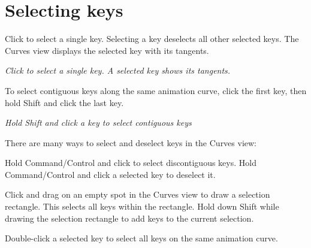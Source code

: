 \chapter{Selecting keys}
\hypertarget{md__hey_tea_9_2_library_2_package_cache_2com_8unity_8timeline_0d1_87_85_2_documentation_0i_2crv__keys__sel}{}\label{md__hey_tea_9_2_library_2_package_cache_2com_8unity_8timeline_0d1_87_85_2_documentation_0i_2crv__keys__sel}
\label{md__hey_tea_9_2_library_2_package_cache_2com_8unity_8timeline_0d1_87_85_2_documentation_0i_2crv__keys__sel_autotoc_md4640}%
%
 Click to select a single key. Selecting a key deselects all other selected keys. The Curves view displays the selected key with its tangents.



{\itshape Click to select a single key. A selected key shows its tangents.}

To select contiguous keys along the same animation curve, click the first key, then hold Shift and click the last key.



{\itshape Hold Shift and click a key to select contiguous keys}

There are many ways to select and deselect keys in the Curves view\+:


\begin{DoxyItemize}
\item Hold Command/\+Control and click to select discontiguous keys. Hold Command/\+Control and click a selected key to deselect it.
\item Click and drag on an empty spot in the Curves view to draw a selection rectangle. This selects all keys within the rectangle. Hold down Shift while drawing the selection rectangle to add keys to the current selection.
\item Double-\/click a selected key to select all keys on the same animation curve. 
\end{DoxyItemize}
